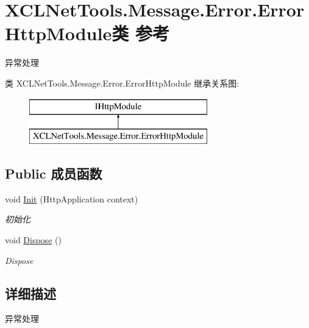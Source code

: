\hypertarget{class_x_c_l_net_tools_1_1_message_1_1_error_1_1_error_http_module}{\section{X\-C\-L\-Net\-Tools.\-Message.\-Error.\-Error\-Http\-Module类 参考}
\label{class_x_c_l_net_tools_1_1_message_1_1_error_1_1_error_http_module}
}


异常处理  


类 X\-C\-L\-Net\-Tools.\-Message.\-Error.\-Error\-Http\-Module 继承关系图\-:\begin{figure}[H]
\begin{center}
\leavevmode
\includegraphics[height=2.000000cm]{class_x_c_l_net_tools_1_1_message_1_1_error_1_1_error_http_module}
\end{center}
\end{figure}
\subsection*{Public 成员函数}
\begin{DoxyCompactItemize}
\item 
void \hyperlink{class_x_c_l_net_tools_1_1_message_1_1_error_1_1_error_http_module_aa4e06d53382795826ed453b62afa265d}{Init} (Http\-Application context)
\begin{DoxyCompactList}\small\item\em 初始化 \end{DoxyCompactList}\item 
void \hyperlink{class_x_c_l_net_tools_1_1_message_1_1_error_1_1_error_http_module_a796d6d747b8620b5e260858e05abd09f}{Dispose} ()
\begin{DoxyCompactList}\small\item\em Dispose \end{DoxyCompactList}\end{DoxyCompactItemize}


\subsection{详细描述}
异常处理 



